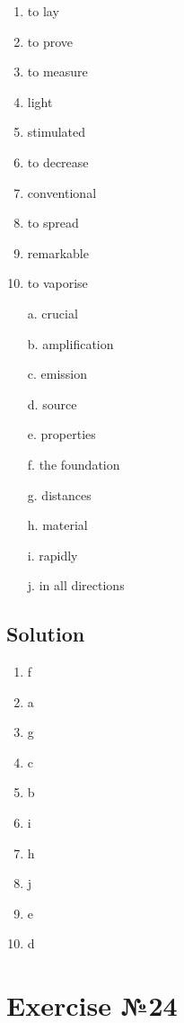 \begin{enumerate}
      \item to lay
      \item to prove
      \item to measure
      \item light
      \item stimulated
      \item to decrease
      \item conventional
      \item to spread
      \item remarkable
      \item to vaporise \\
\end{enumerate}

\begin{enumerate}
      \item[a.] crucial
      \item[b.] amplification
      \item[c.] emission
      \item[d.] source
      \item[e.] properties
      \item[f.] the foundation
      \item[g.] distances
      \item[h.] material
      \item[i.] rapidly
      \item[j.] in all directions
\end{enumerate}

\subsection*{Solution}
\begin{enumerate}
      \item f
      \item a
      \item g
      \item c
      \item b
      \item i
      \item h
      \item j
      \item e
      \item d
\end{enumerate}

\section{Exercise №24}
